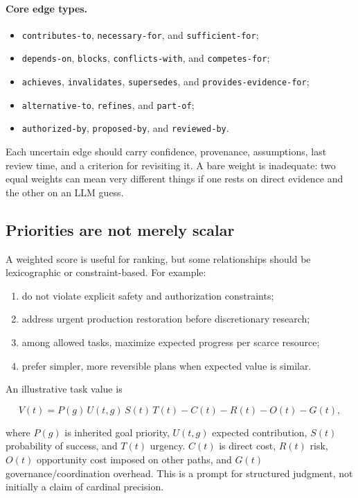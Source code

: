 \documentclass[11pt,letterpaper]{article}
\begin{document}
\paragraph{Core edge types.}
\begin{itemize}
  \item \texttt{contributes-to}, \texttt{necessary-for}, and
        \texttt{sufficient-for};
  \item \texttt{depends-on}, \texttt{blocks}, \texttt{conflicts-with}, and
        \texttt{competes-for};
  \item \texttt{achieves}, \texttt{invalidates}, \texttt{supersedes}, and
        \texttt{provides-evidence-for};
  \item \texttt{alternative-to}, \texttt{refines}, and \texttt{part-of};
  \item \texttt{authorized-by}, \texttt{proposed-by}, and
        \texttt{reviewed-by}.
\end{itemize}

Each uncertain edge should carry confidence, provenance, assumptions, last
review time, and a criterion for revisiting it. A bare weight is inadequate:
two equal weights can mean very different things if one rests on direct
evidence and the other on an LLM guess.

\subsection{Priorities are not merely scalar}

A weighted score is useful for ranking, but some relationships should be
lexicographic or constraint-based. For example:

\begin{enumerate}
  \item do not violate explicit safety and authorization constraints;
  \item address urgent production restoration before discretionary research;
  \item among allowed tasks, maximize expected progress per scarce resource;
  \item prefer simpler, more reversible plans when expected value is similar.
\end{enumerate}

An illustrative task value is

\[
V(t) = P(g)\,U(t,g)\,S(t)\,T(t)
       - C(t) - R(t) - O(t) - G(t),
\]

where $P(g)$ is inherited goal priority, $U(t,g)$ expected contribution,
$S(t)$ probability of success, and $T(t)$ urgency. $C(t)$ is direct cost,
$R(t)$ risk, $O(t)$ opportunity cost imposed on other paths, and $G(t)$
governance/coordination overhead. This is a prompt for structured judgment,
not initially a claim of cardinal precision.
\end{document}
